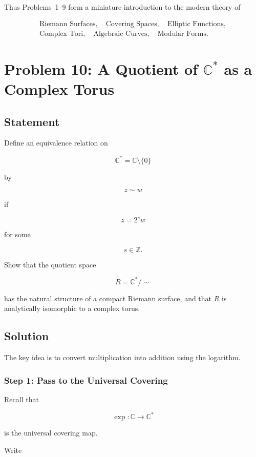 \documentclass[12pt,a4paper]{article}
\theoremstyle{notespace}
\begin{document}
Thus Problems~1--9 form a miniature introduction to the modern theory of

\[
\boxed{
	\begin{gathered}
		\text{Riemann Surfaces},\quad
		\text{Covering Spaces},\quad
		\text{Elliptic Functions},\\
		\text{Complex Tori},\quad
		\text{Algebraic Curves},\quad
		\text{Modular Forms}.
	\end{gathered}
}
\]

\section{Problem 10: A Quotient of \texorpdfstring{$\mathbb C^\ast$}{C*} as a Complex Torus}

\subsection*{Statement}

Define an equivalence relation on

\[
\mathbb C^\ast=\mathbb C\setminus\{0\}
\]

by

\[
z\sim w
\]

if

\[
z=2^s w
\]

for some

\[
s\in\mathbb Z.
\]

Show that the quotient space

\[
R=\mathbb C^\ast/\sim
\]

has the natural structure of a compact Riemann surface, and that \(R\) is analytically isomorphic to a complex torus.

\subsection*{Solution}

The key idea is to convert multiplication into addition using the logarithm.

\subsubsection*{Step 1: Pass to the Universal Covering}

Recall that

\[
\exp:\mathbb C\to\mathbb C^\ast
\]

is the universal covering map.

Write
\end{document}
